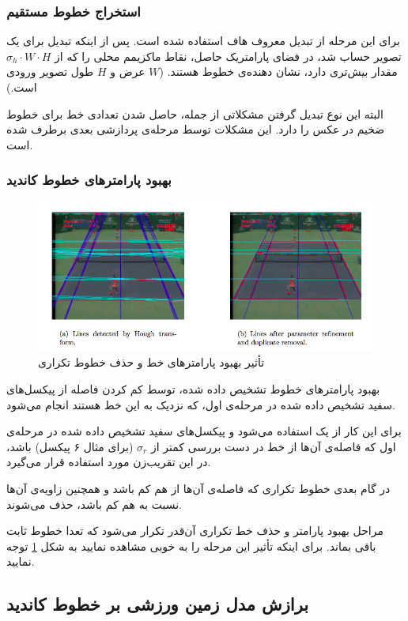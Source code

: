 \documentclass{report}
\begin{document}
\subsubsection{استخراج خطوط مستقیم}
برای این مرحله از تبدیل معروف هاف استفاده شده است. پس از اینکه تبدیل برای یک تصویر حساب شد، در فضای پارامتریک حاصل، نقاط ماکزیمم محلی را که از $\sigma_h \cdot W \cdot H$ مقدار بیش‌تری دارد، نشان دهنده‌ی خطوط هستند. ($W$ عرض و $H$ طول تصویر ورودی است.)

البته این نوع تبدیل گرفتن مشکلاتی از جمله، حاصل شدن تعدادی خط برای خطوط ضخیم در عکس را دارد. این مشکلات توسط مرحله‌ی پردازشی بعدی برطرف شده است.
\subsubsection{بهبود پارامترهای خطوط کاندید}
\begin{figure}
\centering
\includegraphics[scale=0.5]{refined.png}
\caption{تأثیر بهبود پارامترهای خط و حذف خطوط تکراری}
\label{refined}
\end{figure}
بهبود پارامترهای خطوط تشخیص داده شده، توسط کم کردن فاصله از پیکسل‌های سفید تشخیص داده شده در مرحله‌ی اول، که نزدیک به این خط هستند انجام می‌شود.

برای این کار از یک  \cite{LTS} استفاده می‌شود و پیکسل‌های سفید تشخیص داده شده در مرحله‌ی اول که فاصله‌ی آن‌ها از خط در دست بررسی کمتر از $\sigma_r$ (برای مثال ۶ پیکسل) باشد، در این تقریب‌زن مورد استفاده قرار می‌گیرد.

در گام بعدی خطوط تکراری که فاصله‌ی آن‌ها از هم کم باشد و همچنین زاویه‌ی آن‌ها نسبت به هم کم باشد، حذف می‌شوند.

مراحل بهبود پارامتر و حذف خط تکراری آن‌قدر تکرار می‌شود که تعدا خطوط ثابت باقی بماند. برای اینکه تأثیر این مرحله را به خوبی مشاهده نمایید به شکل \ref{refined} توجه نمایید.
\subsection{برازش مدل زمین ورزشی بر خطوط کاندید}
\end{document}
